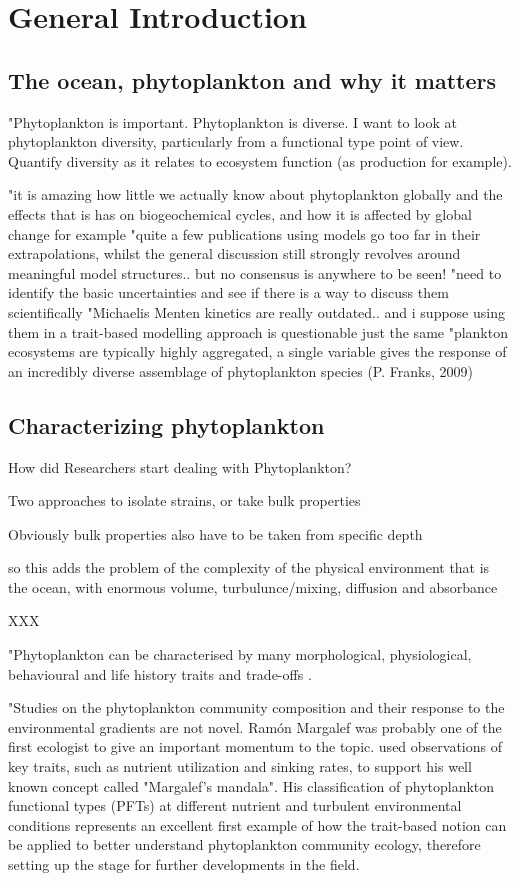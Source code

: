 \chapter{General Introduction}

\section{The ocean, phytoplankton and why it matters}
"Phytoplankton is important. Phytoplankton is diverse. I want to look at phytoplankton diversity, particularly from a functional type point of view. Quantify diversity as it relates to ecosystem function (as production for example).

"it is amazing how little we actually know about phytoplankton globally and the effects that is has on biogeochemical cycles, and how it is affected by global change for example
"quite a few publications using models go too far in their extrapolations, whilst the general discussion still strongly revolves around meaningful model structures.. but no consensus is anywhere to be seen!
"need to identify the basic uncertainties and see if there is a way to discuss them scientifically
"Michaelis Menten kinetics are really outdated.. and i suppose using them in a trait-based modelling approach is questionable just the same
"plankton ecosystems are typically highly aggregated, a single variable gives the response of an incredibly diverse assemblage of phytoplankton species (P. Franks, 2009)


\section{Characterizing phytoplankton}
How did Researchers start dealing with Phytoplankton?

Two approaches to isolate strains, or take bulk properties

Obviously bulk properties also have to be taken from specific depth

so this adds the problem of the complexity of the physical environment that is the ocean, with enormous volume, turbulunce/mixing, diffusion and absorbance

XXX

"Phytoplankton can be characterised by many morphological, physiological, behavioural and life history traits and trade-offs \citep{Litchman2008, Litchman2010}.

"Studies on the phytoplankton community composition and their response to the environmental gradients are not novel. Ramón Margalef was probably one of the first ecologist to give an important momentum to the topic.  \citep{Margalef1978} used observations of key traits, such as nutrient utilization and sinking rates, to support his well known concept called "Margalef's mandala". His classification of phytoplankton functional types (PFTs) at different nutrient and turbulent environmental conditions represents an excellent first example of how the trait-based notion can be applied to better understand phytoplankton community ecology, therefore setting up the stage for further developments in the field.


